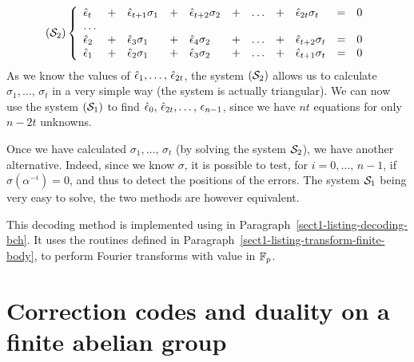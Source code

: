 \begin{equation*}
(\mathcal{S}_2) \left\{ \begin{array}{lllllllllll} \hat{\epsilon}_t & + & \hat{\epsilon}_{t+1}\sigma_1 & + & \hat{\epsilon}_{t+2}\sigma_2 & + & \ldots & + & \hat{\epsilon}_{2 t}\sigma_t & = & 0 \\ \ldots &&&&&&&&&& \\ \hat{\epsilon}_2 & + & \hat{\epsilon}_3\sigma_1 & + & \hat{\epsilon}_4\sigma_2 & + & \ldots & + & \hat{\epsilon}_{t+2}\sigma_t & = & 0 \\ \hat{\epsilon}_1 & + & \hat{\epsilon}_2\sigma_1 & + & \hat{\epsilon}_3\sigma_2 & + & \ldots & + & \hat{\epsilon}_{t+1}\sigma_t & = & 0 \end{array} \right.
\end{equation*}
As we know the values of $ \hat{\epsilon}_1, \ldots, \, \hat{\epsilon}_{2t} $, the system $ (\mathcal{S}_2) $ allows us to calculate $ \sigma_1, \ldots , \, \sigma_t $ in a very simple way (the system is actually triangular). We can now use the system $ (\mathcal{S}_1) $ to find $ \hat{\epsilon}_0, \, \hat{\epsilon}_{2t}, \ldots, \, \epsilon_{n-1} $, since we have $ nt $ equations for only $ n-2t $ unknowns.
 
\begin{rem}
Once we have calculated $ \sigma_1, \ldots, \, \sigma_t $ (by solving the system $ \mathcal{S}_2 $), we have another alternative. Indeed, since we know $ \sigma $, it is possible to test, for $ i = 0, \ldots, \, n-1 $, if $ \sigma (\alpha^{- i}) = 0 $, and thus to detect the positions of the errors. The system $ \mathcal{S}_1 $ being very easy to solve, the two methods are however equivalent.
\end{rem}
 
 
 
This decoding method is implemented using \Maple{} in Paragraph~\ref{sect1-listing-decoding-bch}. It uses the routines defined in Paragraph~\ref{sect1-listing-transform-finite-body}, to perform Fourier transforms with value in $ \mathbb{F}_p $.
\section{Correction codes and duality on a finite abelian group}
\label{sect1-codes-correctors-duality}
 
